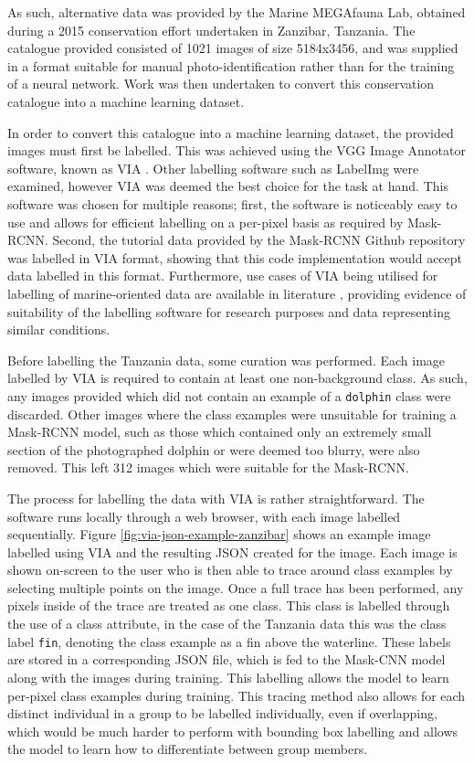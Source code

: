 As such, alternative data was provided by the Marine MEGAfauna Lab, obtained during a 2015 conservation effort undertaken in Zanzibar, Tanzania. The catalogue provided consisted of 1021 images of size 5184x3456, and was supplied in a format suitable for manual photo-identification rather than for the training of a neural network. Work was then undertaken to convert this conservation catalogue into a machine learning dataset. 

In order to convert this catalogue into a machine learning dataset, the provided images must first be labelled. This was achieved using the VGG Image Annotator software, known as VIA \cite{dutta_via_2019}. Other labelling software such as LabelImg \cite{tzutalin_labelimg_2021} were examined, however VIA was deemed the best choice for the task at hand. This software was chosen for multiple reasons; first, the software is noticeably easy to use and allows for efficient labelling on a per-pixel basis as required by Mask-RCNN. Second, the tutorial data provided by the Mask-RCNN Github repository was labelled in VIA format, showing that this code implementation would accept data labelled in this format. Furthermore, use cases of VIA being utilised for labelling of marine-oriented data are available in literature \cite{nita_cnn-based_2020}, providing evidence of suitability of the labelling software for research purposes and data representing similar conditions.

Before labelling the Tanzania data, some curation was performed. Each image labelled by VIA is required to contain at least one non-background class. As such, any images provided which did not contain an example of a \texttt{dolphin} class were discarded. Other images where the class examples were unsuitable for training a Mask-RCNN model, such as those which contained only an extremely small section of the photographed dolphin or were deemed too blurry, were also removed. This left 312 images which were suitable for the Mask-RCNN.

The process for labelling the data with VIA is rather straightforward. The software runs locally through a web browser, with each image labelled sequentially. Figure \ref{fig:via-json-example-zanzibar} shows an example image labelled using VIA and the resulting JSON created for the image. Each image is shown on-screen to the user who is then able to trace around class examples by selecting multiple points on the image. Once a full trace has been performed, any pixels inside of the trace are treated as one class. This class is labelled through the use of a class attribute, in the case of the Tanzania data this was the class label \texttt{fin}, denoting the class example as a fin above the waterline. These labels are stored in a corresponding JSON file, which is fed to the Mask-CNN model along with the images during training. This labelling allows the model to learn per-pixel class examples during training. This tracing method also allows for each distinct individual in a group to be labelled individually, even if overlapping, which would be much harder to perform with bounding box labelling and allows the model to learn how to differentiate between group members.  

